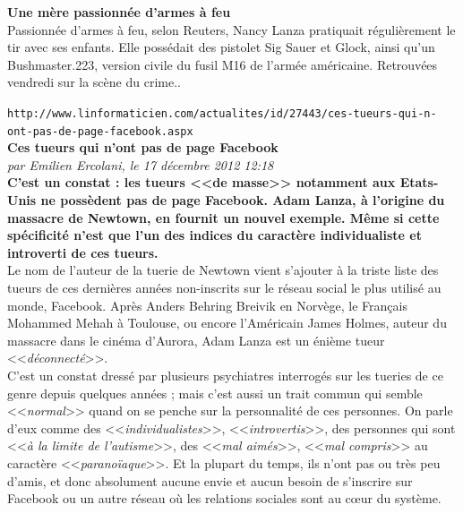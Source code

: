 \documentclass[11pt,twoside,a4paper]{article}
\begin{document}
\textbf{Une m{\`e}re passionn{\'e}e d'armes {\`a} feu}~\\

Passionn{\'e}e d'armes {\`a} feu, selon Reuters, Nancy Lanza pratiquait r{\'e}guli{\`e}rement le tir avec ses enfants. Elle poss{\'e}dait des pistolet Sig Sauer et Glock, ainsi qu'un Bushmaster.223, version civile du fusil M16 de l'arm{\'e}e am{\'e}ricaine. Retrouv{\'e}es vendredi sur la sc{\`e}ne du crime..  ~\\

\clearpage

\texttt{http://www.linformaticien.com/actualites/id/27443/ces-tueurs-qui-n-ont-pas-de-page-facebook.aspx}~\\

\textbf{\LARGE Ces tueurs qui n'ont pas de page Facebook}~\\

\emph{par Emilien Ercolani, le 17 d{\'e}cembre 2012 12:18}~\\

\textbf{C'est un constat : les tueurs <<de masse>> notamment aux Etats-Unis ne poss{\`e}dent pas de page Facebook. Adam Lanza, {\`a} l'origine du massacre de Newtown, en fournit un nouvel exemple. M{\^e}me si cette sp{\'e}cificit{\'e} n'est que l'un des indices du caract{\`e}re individualiste et introverti de ces tueurs. }~\\ 

Le nom de l'auteur de la tuerie de Newtown vient s'ajouter {\`a} la triste liste des tueurs de ces derni{\`e}res ann{\'e}es non-inscrits sur le r{\'e}seau social le plus utilis{\'e} au monde, Facebook. Apr{\`e}s Anders Behring Breivik en Norv{\`e}ge, le Fran\c{c}ais Mohammed Mehah {\`a} Toulouse, ou encore l'Am{\'e}ricain James Holmes, auteur du massacre dans le cin{\'e}ma d'Aurora, Adam Lanza est un {\'e}ni{\`e}me tueur <<\emph{d{\'e}connect{\'e}}>>. ~\\ 

C'est un constat dress{\'e} par plusieurs psychiatres interrog{\'e}s sur les tueries de ce genre depuis quelques ann{\'e}es ; mais c'est aussi un trait commun qui semble <<\emph{normal}>> quand on se penche sur la personnalit{\'e} de ces personnes. On parle d'eux comme des <<\emph{individualistes}>>, <<\emph{introvertis}>>, des personnes qui sont <<\emph{{\`a} la limite de l'autisme}>>, des <<\emph{mal aim{\'e}s}>>, <<\emph{mal compris}>> au caract{\`e}re <<\emph{parano{\"i}aque}>>. Et la plupart du temps, ils n'ont pas ou tr{\`e}s peu d'amis, et donc absolument aucune envie et aucun besoin de s'inscrire sur Facebook ou un autre r{\'e}seau o{\`u} les relations sociales sont au c\oe ur du syst{\`e}me. ~\\
\end{document}

